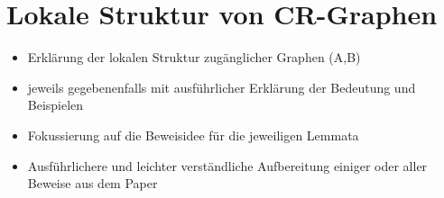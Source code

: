 \section{Lokale Struktur von CR-Graphen}
\label{sec/struktur_lokal}

\begin{itemize}
	\item Erklärung der lokalen Struktur zugänglicher Graphen (A,B)
	\item jeweils gegebenenfalls mit ausführlicher Erklärung der Bedeutung und Beispielen
	\item Fokussierung auf die Beweisidee für die jeweiligen Lemmata
	\item Ausführlichere und leichter verständliche Aufbereitung einiger oder aller Beweise aus dem Paper
\end{itemize}